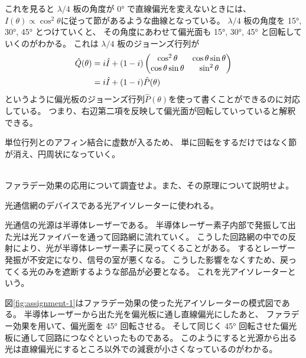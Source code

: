 \documentclass[9pt,dvipdfmx,a4paper]{jsarticle}
\begin{document}
これを見ると \(\lambda/4\) 板の角度が \ang{0} で直線偏光を変えないときには、
\(I(\theta)\propto\cos^2\theta\)に従って節があるような曲線となっている。
\(\lambda/4\) 板の角度を \ang{15}, \ang{30}, \ang{45} とつけていくと、
その角度にあわせて偏光面も \ang{15}, \ang{30}, \ang{45} と回転していくのがわかる。
これは \(\lambda/4\) 板のジョーンズ行列が
\begin{align}
    \hat{Q}(\theta)
    &=i\hat{I} + (1-i)\begin{pmatrix}
        \cos^2 \theta & \cos\theta\sin\theta\\
        \cos\theta\sin\theta & \sin^2\theta
    \end{pmatrix}\notag\\
    &=i\hat{I} + (1-i)\hat{P}(\theta)
\end{align}
というように偏光板のジョーンズ行列\(\hat{P}(\theta)\)を使って書くことができるのに対応している。
つまり、右辺第二項を反映して偏光面が回転していっていると解釈できる。

単位行列とのアフィン結合に虚数が入るため、
単に回転をするだけではなく節が消え、円周状になっていく。\\ \\

\begin{tcolorbox}[colbacktitle=white, coltitle=black, colback=white, title = 課題3]
    ファラデー効果の応用について調査せよ。また、その原理について説明せよ。
\end{tcolorbox}
光通信網のデバイスである光アイソレーターに使われる。

光通信の光源は半導体レーザーである。
半導体レーザー素子内部で発振して出た光は光ファイバーを通って回路網に流れていく。
こうした回路網の中での反射により、光が半導体レーザー素子に戻ってくることがある。
するとレーザー発振が不安定になり、信号の室が悪くなる。
こうした影響をなくすため、戻ってくる光のみを遮断するような部品が必要となる。
これを光アイソレーターという。

図\ref{fig:assignment-1}はファラデー効果の使った光アイソレーターの模式図である。
半導体レーザーから出た光を偏光板に通し直線偏光にしたあと、
ファラデー効果を用いて、偏光面を \ang{45} 回転させる。
そして同じく \ang{45} 回転させた偏光板に通して回路につなぐといったものである。
このようにすると光源から出る光は直線偏光にするところ以外での減衰が小さくなっているのがわかる。
\end{document}
